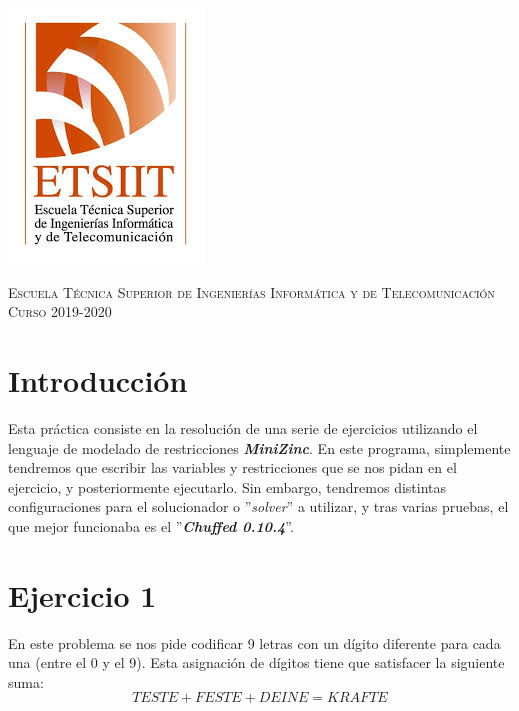 \documentclass[11pt,a4paper]{article}
\begin{document}
\begin{titlepage}
\begin{minipage}{\textwidth}
\includegraphics[scale=0.3]{img/etsiit.jpeg}

\vspace{0.7cm}
\textsc{Escuela Técnica Superior de Ingenierías Informática y de Telecomunicación}\\
\vspace{1cm}
\textsc{Curso 2019-2020}
\end{minipage}
\end{titlepage}

\tableofcontents
\thispagestyle{empty}				%

\newpage

\setlength{\parskip}{1em}
\setcounter{page}{1}

\section*{Introducción}

Esta práctica consiste en la resolución de una serie de ejercicios utilizando el lenguaje de modelado de restricciones \textbf{\textit{MiniZinc}}.
En este programa, simplemente tendremos que escribir las variables y restricciones que se nos pidan en el ejercicio, y posteriormente ejecutarlo.
Sin embargo, tendremos distintas configuraciones para el solucionador o ''\textit{solver}'' a utilizar, y tras varias pruebas, el que mejor
funcionaba es el ''\textbf{\textit{Chuffed 0.10.4}}''.



\section*{Ejercicio 1}
En este problema se nos pide codificar 9 letras con un dígito diferente para cada una (entre el 0 y el 9). Esta asignación de dígitos tiene que
satisfacer la siguiente suma:
\begin{equation*}
    TESTE+FESTE+DEINE=KRAFTE
\end{equation*}
\end{document}
